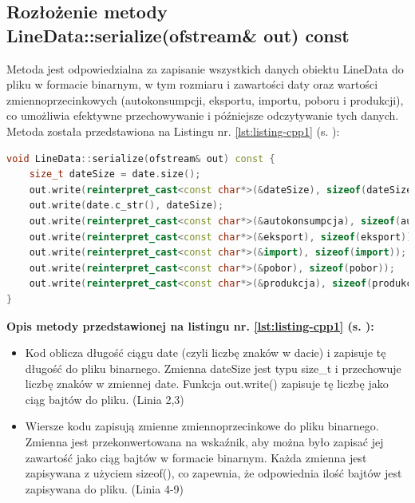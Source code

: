 \subsection{Rozłożenie metody LineData::serialize(ofstream\& out) const}
Metoda jest odpowiedzialna za zapisanie wszystkich danych obiektu LineData do pliku w formacie binarnym, w tym rozmiaru i zawartości daty oraz wartości zmiennoprzecinkowych (autokonsumpcji, eksportu, importu, poboru i produkcji), co umożliwia efektywne przechowywanie i późniejsze odczytywanie tych danych. Metoda została przedstawiona na Listingu nr. \ref{lst:listing-cpp1} (s. \pageref{lst:listing-cpp1}): \\
\begin{lstlisting}[caption=LineData::serialize(ofstream\& out) const, label={lst:listing-cpp1}, language=C++]
void LineData::serialize(ofstream& out) const {
    size_t dateSize = date.size();
    out.write(reinterpret_cast<const char*>(&dateSize), sizeof(dateSize));
    out.write(date.c_str(), dateSize);
    out.write(reinterpret_cast<const char*>(&autokonsumpcja), sizeof(autokonsumpcja));
    out.write(reinterpret_cast<const char*>(&eksport), sizeof(eksport));
    out.write(reinterpret_cast<const char*>(&import), sizeof(import));
    out.write(reinterpret_cast<const char*>(&pobor), sizeof(pobor));
    out.write(reinterpret_cast<const char*>(&produkcja), sizeof(produkcja));
}
\end{lstlisting}
\textbf{Opis metody przedstawionej na listingu nr. \ref{lst:listing-cpp1} (s. \pageref{lst:listing-cpp1}):}
\begin{itemize}
    \item Kod oblicza długość ciągu date (czyli liczbę znaków w dacie) i zapisuje tę długość do pliku binarnego. Zmienna dateSize jest typu size\_t i przechowuje liczbę znaków w zmiennej date. Funkcja out.write() zapisuje tę liczbę jako ciąg bajtów do pliku. (Linia 2,3)
    \item Wiersze kodu zapisują zmienne zmiennoprzecinkowe do pliku binarnego. Zmienna jest przekonwertowana na wskaźnik, aby można było zapisać jej zawartość jako ciąg bajtów w formacie binarnym. Każda zmienna jest zapisywana z użyciem sizeof(), co zapewnia, że odpowiednia ilość bajtów jest zapisywana do pliku. (Linia 4-9)
\end{itemize}
\newpage
